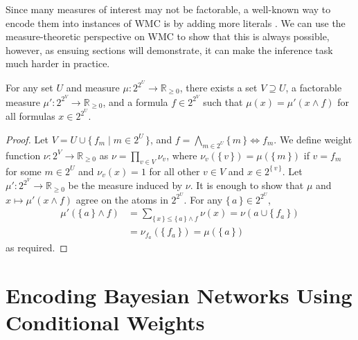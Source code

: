 Since many measures of interest may not be factorable, a well-known way to
encode them into instances of WMC is by adding more literals
\citep{DBLP:journals/ai/ChaviraD08}. We can use the measure-theoretic
perspective on WMC to show that this is always possible, however, as ensuing
sections will demonstrate, it can make the inference task much harder in
practice.

\begin{theorem}
  For any set $U$ and measure $\mu\colon 2^{2^U} \to \mathbb{R}_{\ge 0}$, there
  exists a set $V \supseteq U$, a factorable measure $\mu'\colon 2^{2^V} \to
  \mathbb{R}_{\ge 0}$, and a formula $f \in 2^{2^V}$ such that $\mu(x) = \mu'(x
  \land f)$ for all formulas $x \in 2^{2^U}$.
\end{theorem}
\begin{proof}
  Let $V = U \cup \{\, f_m \mid m \in 2^U \,\}$, and
  $f = \bigwedge_{m \in 2^U} \{\, m \,\} \Leftrightarrow f_m$. We define weight
  function $\nu\colon 2^V \to \mathbb{R}_{\ge 0}$ as
  $\nu = \prod_{v \in V} \nu_v$, where $\nu_v(\{\, v \,\}) = \mu(\{\, m \,\})$
  if $v = f_m$ for some $m \in 2^U$ and $\nu_v(x) = 1$ for all other $v \in V$
  and $x \in 2^{\{\, v \,\}}$. Let $\mu'\colon 2^{2^V} \to \mathbb{R}_{\ge 0}$
  be the measure induced by $\nu$. It is enough to show that $\mu$ and
  $x \mapsto \mu'(x \land f)$ agree on the atoms in $2^{2^U}$. For any
  $\{\, a \,\} \in 2^{2^U}$,
  \begin{align*}
    \mu'(\{\, a \,\} \land f) &= \sum_{\{\, x \,\} \le \{\, a \,\} \land f} \nu(x) = \nu(a \cup \{\, f_a \,\}) \\
                              &= \nu_{f_a}(\{\, f_a \,\}) = \mu(\{\, a \,\})
  \end{align*}
  as required.
\end{proof}

\section{Encoding Bayesian Networks Using Conditional Weights}\label{sec:bns}

